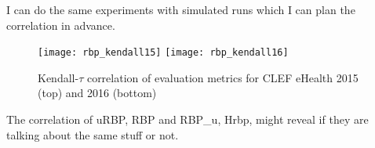 I can do the same experiments with simulated runs which I can plan the correlation in advance. 


\begin{figure*}[t!]
  \centering
   \texttt{[image: rbp\_kendall15]}
   \texttt{[image: rbp\_kendall16]}
    \caption{Kendall-$\tau$ correlation of evaluation metrics for CLEF eHealth 2015 (top) and 2016 (bottom)}
  \label{fig:rbp_kendall}
\end{figure*}


The correlation of uRBP, RBP and RBP\_u, Hrbp, might reveal if they are talking about the same stuff or not.



